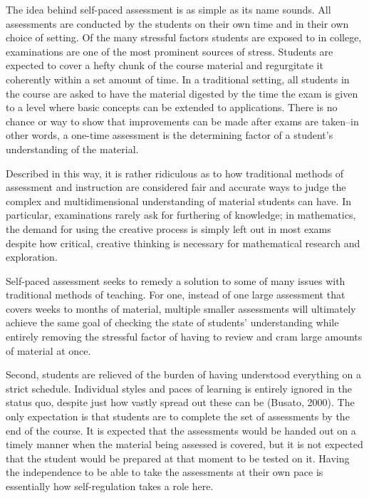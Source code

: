 The idea behind self-paced assessment is as simple as its name sounds. All assessments are conducted by the students on their own time and in their own choice of setting. Of the many stressful factors students are exposed to in college, examinations are one of the most prominent sources of stress. Students are expected to cover a hefty chunk of the course material and regurgitate it coherently within a set amount of time. In a traditional setting, all students in the course are asked to have the material digested by the time the exam is given to a level where basic concepts can be extended to applications. There is no chance or way to show that improvements can be made after exams are taken--in other words, a one-time assessment is the determining factor of a student's understanding of the material.

Described in this way, it is rather ridiculous as to how traditional methods of assessment and instruction are considered fair and accurate ways to judge the complex and multidimensional understanding of material students can have. In particular, examinations rarely ask for furthering of knowledge; in mathematics, the demand for using the creative process is simply left out in most exams despite how critical, creative thinking is necessary for mathematical research and exploration.

Self-paced assessment seeks to remedy a solution to some of many issues with traditional methods of teaching. For one, instead of one large assessment that covers weeks to months of material, multiple smaller assessments will ultimately achieve the same goal of checking the state of students' understanding while entirely removing the stressful factor of having to review and cram large amounts of material at once.

Second, students are relieved of the burden of having understood everything on a strict schedule. Individual styles and paces of learning is entirely ignored in the status quo, despite just how vastly spread out these can be (Busato, 2000). The only expectation is that students are to complete the set of assessments by the end of the course. It is expected that the assessments would be handed out on a timely manner when the material being assessed is covered, but it is not expected that the student would be prepared at that moment to be tested on it. Having the independence to be able to take the assessments at their own pace is essentially how self-regulation takes a role here.

